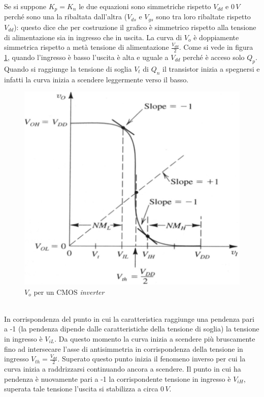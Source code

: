 \documentclass[12pt, a4paper]{report}
\begin{document}
Se si suppone $K_{p} = K_{n}$ le due equazioni sono simmetriche rispetto $V_{dd}$ e $0\,V$ perché sono una la ribaltata dall'altra ($V_{ds}$ e $V_{gs}$ sono tra loro ribaltate rispetto $V_{dd}$): questo dice che per costruzione il grafico è simmetrico rispetto alla tensione di alimentazione sia in ingresso che in uscita. La curva di $V_{o}$ è doppiamente simmetrica rispetto a metà tensione di alimentazione $\frac{V_{dd}}{2}$. Come si vede in figura \ref{v_o}, quando l'ingresso è basso l'uscita è alta e uguale a $V_{dd}$ perché è acceso solo $Q_p$. Quando si raggiunge la tensione di soglia $V_t$ di $Q_n$ il transistor inizia a spegnersi e infatti la curva inizia a scendere leggermente verso il basso.
\begin{figure}[h]
    \centering
    \includegraphics[scale=0.4,angle=0]{cmos_v.png}
    \caption{$V_{o}$ per un CMOS \textit{inverter}}
    \label{v_o}
\end{figure}
\\In corrispondenza del punto in cui la caratteristica raggiunge una pendenza pari a -1 (la pendenza dipende dalle caratteristiche della tensione di soglia) la tensione in ingresso è $V_{iL}$. Da questo momento la curva inizia a scendere più bruscamente fino ad intersecare l'asse di antisimmetria in corrispondenza della tensione in ingresso $V_{th} = \frac{V_{dd}}{2}$. Superato questo punto inizia il fenomeno inverso per cui la curva inizia a raddrizzarsi continuando ancora a scendere. Il punto in cui ha pendenza è nuovamente pari a -1 la corrispondente tensione in ingresso è $V_{iH}$, superata tale tensione l'uscita si stabilizza a circa $0\,V$.
\end{document}
